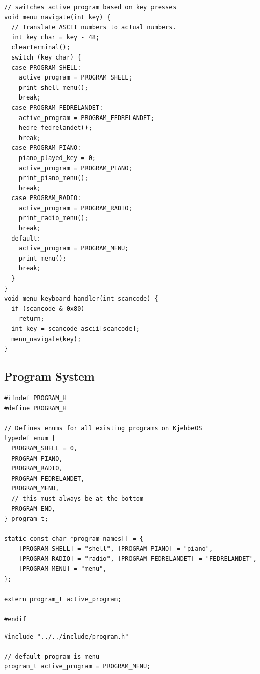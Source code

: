 \documentclass[../main.tex]{subfiles}
\begin{document}
\begin{verbatim}
// switches active program based on key presses
void menu_navigate(int key) {
  // Translate ASCII numbers to actual numbers.
  int key_char = key - 48;
  clearTerminal();
  switch (key_char) {
  case PROGRAM_SHELL:
    active_program = PROGRAM_SHELL;
    print_shell_menu();
    break;
  case PROGRAM_FEDRELANDET:
    active_program = PROGRAM_FEDRELANDET;
    hedre_fedrelandet();
    break;
  case PROGRAM_PIANO:
    piano_played_key = 0;
    active_program = PROGRAM_PIANO;
    print_piano_menu();
    break;
  case PROGRAM_RADIO:
    active_program = PROGRAM_RADIO;
    print_radio_menu();
    break;
  default:
    active_program = PROGRAM_MENU;
    print_menu();
    break;
  }
}
void menu_keyboard_handler(int scancode) {
  if (scancode & 0x80)
    return;
  int key = scancode_ascii[scancode];
  menu_navigate(key);
}

\end{verbatim}


\subsection{Program System}
\label{apx:program_system}


\label{lst:program_h}
\begin{verbatim}
#ifndef PROGRAM_H
#define PROGRAM_H

// Defines enums for all existing programs on KjebbeOS
typedef enum {
  PROGRAM_SHELL = 0,
  PROGRAM_PIANO,
  PROGRAM_RADIO,
  PROGRAM_FEDRELANDET,
  PROGRAM_MENU,
  // this must always be at the bottom
  PROGRAM_END,
} program_t;

static const char *program_names[] = {
    [PROGRAM_SHELL] = "shell", [PROGRAM_PIANO] = "piano",
    [PROGRAM_RADIO] = "radio", [PROGRAM_FEDRELANDET] = "FEDRELANDET",
    [PROGRAM_MENU] = "menu",
};

extern program_t active_program;

#endif

\end{verbatim}


\label{lst:program_c}
\begin{verbatim}
#include "../../include/program.h"

// default program is menu
program_t active_program = PROGRAM_MENU;

\end{verbatim}
\end{document}
